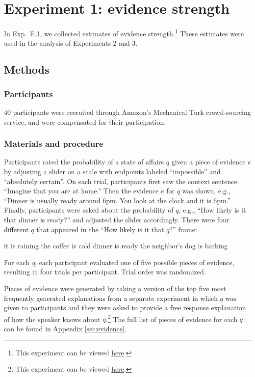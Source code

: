 \documentclass[11pt]{article}
\newcommand{\appref}[1]{Appendix \ref{#1}}
\begin{document}
\section{Experiment 1: evidence strength}

In Exp.~E.1, we collected estimates of evidence strength.\footnote{This experiment can be viewed \href{https://web.stanford.edu/~justinek/modals_exp/evidence.html}{here}.} These estimates were used in the analysis of Experiments 2 and 3.

\subsection{Methods}

\subsubsection{Participants}

40 participants were recruited through Amazon's Mechanical Turk crowd-sourcing service, and were compensated for their participation.

\subsubsection{Materials and procedure}

Participants rated the probability of a state of affairs $q$ given a piece of evidence $e$ by adjusting a slider on a scale with endpoints labeled ``impossible'' and ``absolutely certain''. On each trial, participants first saw the context sentence ``Imagine that you are at home.'' Then the evidence $e$ for $q$ was shown, e.g., ``Dinner is usually ready around 6pm. You look at the clock and it is 6pm.'' Finally, participants were asked about the probability of $q$, e.g., ``How likely is it that dinner is ready?'' and adjusted the slider accordingly. There were four different $q$ that appeared in the ``How likely is it that $q$?'' frame:

\begin{exe}
	\ex it is raining
	\ex the coffee is cold
	\ex dinner is ready
	\ex the neighbor's dog is barking
\end{exe}

For each \emph{q}, each participant evaluated one of five possible pieces of evidence, resulting in four trials per participant. Trial order was randomized. 

Pieces of evidence were generated by taking a version of the top five most frequently generated explanations from a separate experiment in which $q$ was given to participants and they were asked to provide a free response explanation of how the speaker knows about $q$.\footnote{This experiment can be viewed \href{http://stanford.edu/~jdegen/68_modals_freeproduction/modals.html}{here}.} The full list of pieces of evidence for each $q$ can be found in \appref{sec:evidence}.
\end{document}
